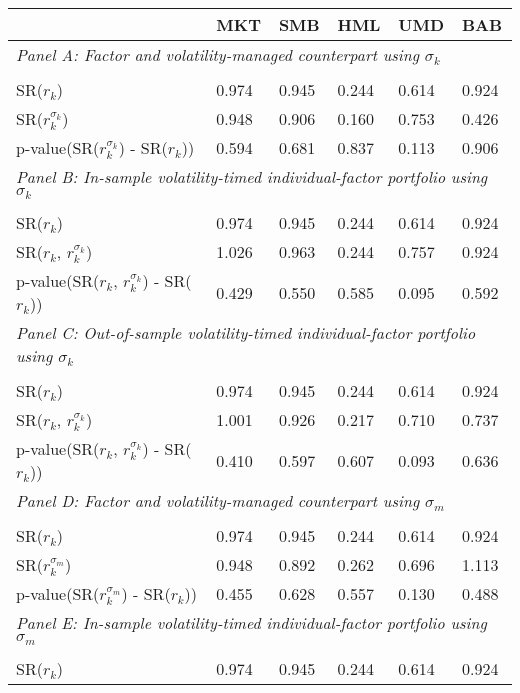 \begin{tabular}{llllll}
\toprule
 & MKT & SMB & HML & UMD & BAB \\
\midrule
\multicolumn{7}{l}{\textit{Panel A: Factor and volatility-managed counterpart using $\sigma_k$}} \\ &  &  &  &  &  \\
SR($r_k$) & 0.974 & 0.945 & 0.244 & 0.614 & 0.924 \\
SR($r_k^{\sigma_k}$) & 0.948 & 0.906 & 0.160 & 0.753 & 0.426 \\
p-value(SR($r_k^{\sigma_k}$) - SR($r_k$)) & 0.594 & 0.681 & 0.837 & 0.113 & 0.906 \\
\multicolumn{7}{l}{\textit{Panel B: In-sample volatility-timed individual-factor portfolio using $\sigma_k$}} \\ &  &  &  &  &  \\
SR($r_k$) & 0.974 & 0.945 & 0.244 & 0.614 & 0.924 \\
SR($r_k$, $r_k^{\sigma_k}$) & 1.026 & 0.963 & 0.244 & 0.757 & 0.924 \\
p-value(SR($r_k$, $r_k^{\sigma_k}$) - SR($r_k$)) & 0.429 & 0.550 & 0.585 & 0.095 & 0.592 \\
\multicolumn{7}{l}{\textit{Panel C: Out-of-sample volatility-timed individual-factor portfolio using $\sigma_k$}} \\ &  &  &  &  &  \\
SR($r_k$) & 0.974 & 0.945 & 0.244 & 0.614 & 0.924 \\
SR($r_k$, $r_k^{\sigma_k}$) & 1.001 & 0.926 & 0.217 & 0.710 & 0.737 \\
p-value(SR($r_k$, $r_k^{\sigma_k}$) - SR($r_k$)) & 0.410 & 0.597 & 0.607 & 0.093 & 0.636 \\
\multicolumn{7}{l}{\textit{Panel D: Factor and volatility-managed counterpart using $\sigma_m$}} \\ &  &  &  &  &  \\
SR($r_k$) & 0.974 & 0.945 & 0.244 & 0.614 & 0.924 \\
SR($r_k^{\sigma_m}$) & 0.948 & 0.892 & 0.262 & 0.696 & 1.113 \\
p-value(SR($r_k^{\sigma_m}$) - SR($r_k$)) & 0.455 & 0.628 & 0.557 & 0.130 & 0.488 \\
\multicolumn{7}{l}{\textit{Panel E: In-sample volatility-timed individual-factor portfolio using $\sigma_m$}} \\ &  &  &  &  &  \\
SR($r_k$) & 0.974 & 0.945 & 0.244 & 0.614 & 0.924 \\

\end{tabular}
